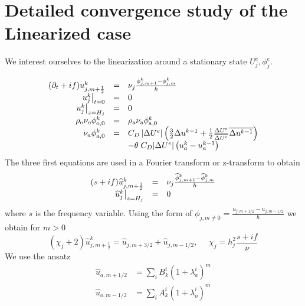 \section{Detailed convergence study of the Linearized case}
\label{appendix:OASchwarz_LinearizedAnalysis}
We interest ourselves to the linearization around a stationary state 
$U^e_j, \phi^e_j$.

\begin{equation*}
\begin{array}{rcll}
	(\partial_t +if) u^{{k}}_{j,m+\frac{1}{2}} &=&
	\nu_j\frac{\phi^{{k}}_{j,m+1} - \phi^{{k}}_{j,m}}{h} \\
	\left.u^{{k}}_j\right|_{t=0} &=& 0 \\
	\left.u^{{k}}_j\right|_{z=H_j} &=& 0\\
	\rho_{\rm o} \nu_{\rm o} \phi^{{k}}_{{\rm o}, 0} &=&
	\rho_{\rm a} \nu_{\rm a} \phi^{{k}}_{{\rm a}, 0} \\
	\nu_a \phi_{{\rm a},0}^{{k}}
	&=& C_D \left|\Delta U^e\right| \left(\frac{3}{2} \Delta u^{
		{k-1}}
	+ \frac{1}{2} \frac{\Delta U^e}{\overline{\Delta U^e}}
		\overline{\Delta u^{
			{{k-1}}}}\right) \\
		&&-{\theta \; C_D|\Delta U^e|
		\left( u_a^{{k}} -
		u_a^{{k-1}}\right)}
\end{array}
\end{equation*}
The three first equations are used in a Fourier transform or
z-transform to obtain
\begin{equation}
\label{eq:FourierTransform}
\begin{array}{rcll}
	(\emphase{s} +if) \widehat{u}^{{k}}_{j,m+\frac{1}{2}} &=&
	\nu_j\frac{\widehat{\phi}^{{k}}_{j,m+1}
	- \widehat{\phi}^{{k}}_{j,m}}{h} \\
	\left.\widehat{u}^{{k}}_j\right|_{z=H_j} &=& 0\\
\end{array}
\end{equation}
where $s$ is the frequency variable.
Using the form of $\phi_{j, m \neq 0} = \frac{u_{j, m+1/2} -
u_{j, m-1/2}}{h}$
we obtain for $m>0$
\begin{equation}
\label{eq:diff_finies_on_u}
	(\chi_j+2) \widehat{u}^{{k}}_{j,m+\frac{1}{2}} =
	\widehat{u}_{j, m+3/2} + \widehat{u}_{j, m-1/2},
	~~~~~~ \chi_j = h_j^2\frac{s + if}{\nu}
\end{equation}
We use the ansatz
\begin{equation*}
\begin{aligned}
\widehat{u}_{a,m+1/2} &= \sum_i B_k^i (1+\lambda_a^i)^m \\
\widehat{u}_{o,m-1/2} &= \sum_i A_k^i (1+\lambda_o^i)^{m}
\end{aligned}
\end{equation*}
